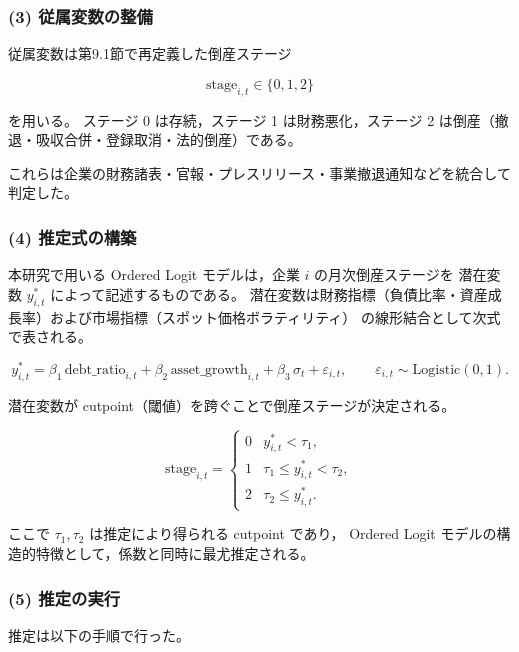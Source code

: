 \subsubsection{(3) 従属変数の整備}

従属変数は第9.1節で再定義した倒産ステージ



\[
\text{stage}_{i,t} \in \{0,1,2\}
\]



を用いる。  
ステージ 0 は存続，ステージ 1 は財務悪化，ステージ 2 は倒産（撤退・吸収合併・登録取消・法的倒産）である。

これらは企業の財務諸表・官報・プレスリリース・事業撤退通知などを統合して判定した。

\subsubsection{(4) 推定式の構築}

本研究で用いる Ordered Logit モデルは，企業 $i$ の月次倒産ステージを
潜在変数 $y^*_{i,t}$ によって記述するものである。
潜在変数は財務指標（負債比率・資産成長率）および市場指標（スポット価格ボラティリティ）
の線形結合として次式で表される。



\[
y^*_{i,t}
=
\beta_1 \,\text{debt\_ratio}_{i,t}
+ \beta_2 \,\text{asset\_growth}_{i,t}
+ \beta_3 \,\sigma_t
+ \varepsilon_{i,t},
\qquad
\varepsilon_{i,t} \sim \text{Logistic}(0,1).
\]



潜在変数が cutpoint（閾値）を跨ぐことで倒産ステージが決定される。



\[
\text{stage}_{i,t} =
\begin{cases}
0 & y^*_{i,t} < \tau_1, \\
1 & \tau_1 \le y^*_{i,t} < \tau_2, \\
2 & \tau_2 \le y^*_{i,t}.
\end{cases}
\]



ここで $\tau_1, \tau_2$ は推定により得られる cutpoint であり，
Ordered Logit モデルの構造的特徴として，係数と同時に最尤推定される。

\subsubsection{(5) 推定の実行}

推定は以下の手順で行った。


